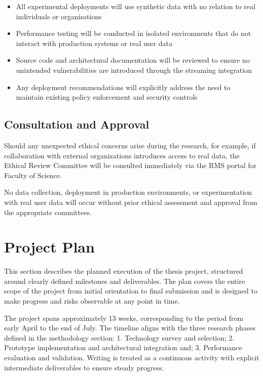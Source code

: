 \documentclass[a4paper,10pt,british]{scrartcl}
\begin{document}
\begin{itemize}
  \item All experimental deployments will use synthetic data with no relation to real individuals or organisations
  \item Performance testing will be conducted in isolated environments that do not interact with production systems or real user data
  \item Source code and architectural documentation will be reviewed to ensure no unintended vulnerabilities are introduced through the streaming integration
  \item Any deployment recommendations will explicitly address the need to maintain existing policy enforcement and security controls
\end{itemize}

\subsection{Consultation and Approval}

Should any unexpected ethical concerns arise during the research, for example, if collaboration with external organizations introduces access to real data, the Ethical Review Committee will be consulted immediately via the RMS portal for Faculty of Science.

No data collection, deployment in production environments, or experimentation with real user data will occur without prior ethical assessment and approval from the appropriate committees.
\section{Project Plan}

This section describes the planned execution of the thesis project, structured around clearly defined milestones and deliverables. The plan covers the entire scope of the project from initial orientation to final submission and is designed to make progress and risks observable at any point in time.

The project spans approximately 13 weeks, corresponding to the period from early April to the end of July. The timeline aligns with the three research phases defined in the methodology section: 1. Technology survey and selection; 2. Prototype implementation and architectural integration and; 3. Performance evaluation and validation. Writing is treated as a continuous activity with explicit intermediate deliverables to ensure steady progress.
\end{document}
